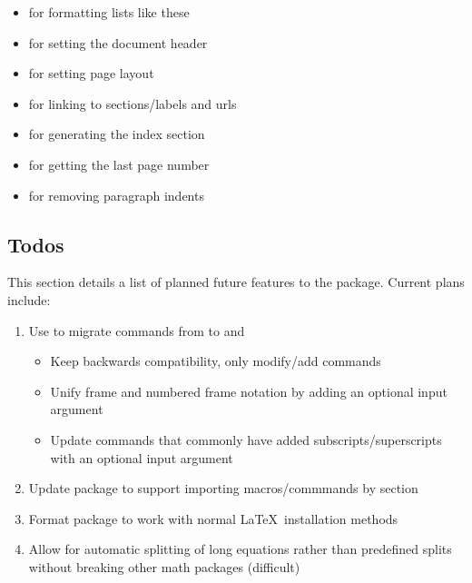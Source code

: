 \begin{enumerate}
\begin{itemize}[noitemsep,label={}]
        \item {} for formatting lists like these \cite{pack:enumitem}
        \item {} for setting the document header \cite{pack:fancyhdr}
        \item {} for setting page layout \cite{pack:geometry}
        \item {} for linking to sections/labels and urls \cite{pack:hyperref}
        \item {} for generating the index section \cite{pack:imakeidx}
        \item {} for getting the last page number \cite{pack:lastpage}
        \item {} for removing paragraph indents \cite{pack:parskip}
    \end{itemize}
\end{enumerate}

\subsection{Todos}
\label{sec:todos}
This section details a list of planned future features to the package. Current plans include:

\begin{enumerate}
    \item Use  to migrate commands from  to  and 
    \begin{itemize}
        \item Keep backwards compatibility, only modify/add commands
        \item Unify frame and numbered frame notation by adding an optional input argument
        \item Update commands that commonly have added subscripts/superscripts with an optional input argument
    \end{itemize}
    \item Update package to support importing macros/commmands by section
    \item Format package to work with normal \LaTeX\ installation methods
    \item Allow for automatic splitting of long equations rather than predefined splits without breaking other math packages (difficult)
\end{enumerate}